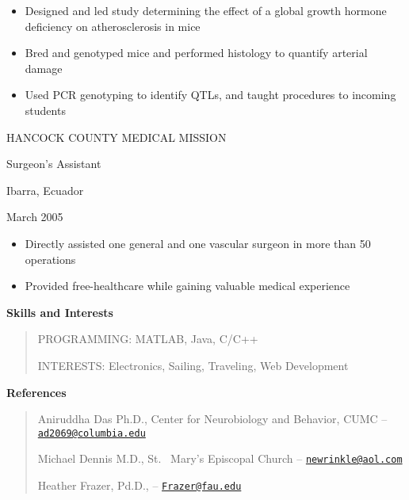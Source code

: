 \begin{itemize}
	\item Designed and led study determining the effect of a global growth hormone deficiency on atherosclerosis in mice
	\item Bred and genotyped mice and performed histology to quantify arterial damage
	\item Used PCR genotyping to identify QTLs, and taught procedures to incoming students
\end{itemize}

HANCOCK COUNTY MEDICAL MISSION 

Surgeon's Assistant 

Ibarra, Ecuador 

March 2005 

\begin{itemize}
	\item Directly assisted one general and one vascular surgeon in more than 50 operations
	\item Provided free-healthcare while gaining valuable medical experience
\end{itemize}

\textbf{Skills and Interests} 

\begin{quote}
	PROGRAMMING: MATLAB, Java, C/C++ 

	INTERESTS: Electronics, Sailing, Traveling, Web Development
\end{quote}

\textbf{References} 

\begin{quote}
	Aniruddha Das Ph.D., Center for Neurobiology and Behavior, CUMC -- \href{mailto:ad2069@columbia.edu}{\nolinkurl{ad2069@columbia.edu}} 

	Michael Dennis M.D., St.
	~Mary's Episcopal Church --
	\href{mailto:newrinkle@aol.com}{\nolinkurl{newrinkle@aol.com}}

	Heather Frazer, Pd.D., --
	\href{mailto:Frazer@fau.edu}{\nolinkurl{Frazer@fau.edu}}
\end{quote}
